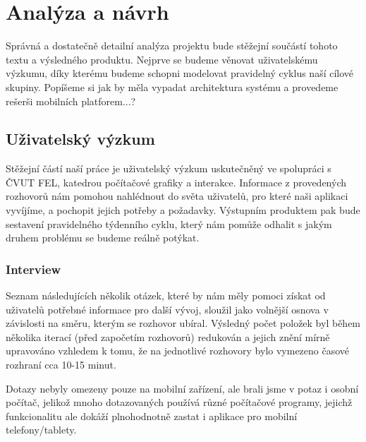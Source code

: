 \documentclass[thesis=M,czech]{FITthesis}[2012/06/26]
\begin{document}
\chapter{Analýza a návrh}
Správná a dostatečně detailní analýza projektu bude stěžejní součástí tohoto textu a výsledného produktu. Nejprve se budeme věnovat uživatelskému výzkumu, díky kterému budeme schopni modelovat pravidelný cyklus naší cílové skupiny. Popíšeme si jak by měla vypadat architektura systému a provedeme rešerši mobilních platforem...?

\section{Uživatelský výzkum}
Stěžejní částí naší práce je uživatelský výzkum uskutečněný ve spolupráci s ČVUT FEL, katedrou počítačové grafiky a interakce. Informace z provedených rozhovorů nám pomohou nahlédnout do světa uživatelů, pro které naši aplikaci vyvíjíme, a pochopit jejich potřeby a požadavky. Výstupním produktem pak bude sestavení pravidelného týdenního cyklu, který nám pomůže odhalit s jakým druhem problému se budeme reálně potýkat.

\subsection{Interview}
Seznam následujících několik otázek, které by nám měly pomoci získat od uživatelů potřebné informace pro další vývoj, sloužil jako volnější osnova v závislosti na směru, kterým se rozhovor ubíral. Výsledný počet položek byl během několika iterací (před započetím rozhovorů) redukován a jejich znění mírně upravováno vzhledem k tomu, že na jednotlivé rozhovory bylo vymezeno časové rozhraní cca 10-15 minut.

Dotazy nebyly omezeny pouze na mobilní zařízení, ale brali jsme v potaz i osobní počítač, jelikož mnoho dotazovaných používá různé počítačové programy, jejichž funkcionalitu ale dokáží plnohodnotně zastat i aplikace pro mobilní telefony/tablety.
\end{document}
